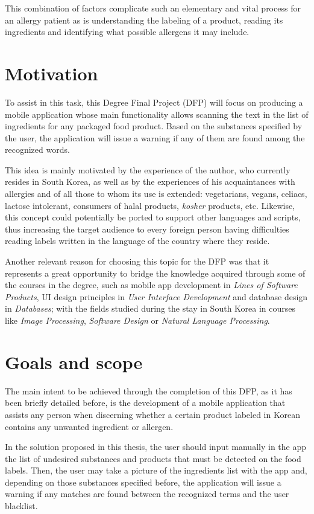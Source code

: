 This combination of factors complicate such an elementary and vital process for an allergy patient as is understanding the labeling of a product, reading its ingredients and identifying what possible allergens it may include.

\section{Motivation}
    
To assist in this task, this Degree Final Project (DFP) will focus on producing a mobile application whose main functionality allows scanning the text in the list of ingredients for any packaged food product. Based on the substances specified by the user, the application will issue a warning if any of them are found among the recognized words.
    
This idea is mainly motivated by the experience of the author, who currently resides in South Korea, as well as by the experiences of his acquaintances with allergies and of all those to whom its use is extended: vegetarians, vegans, celiacs, lactose intolerant, consumers of halal products, \textit{kosher} products, etc. Likewise, this concept could potentially be ported to support other languages and scripts, thus increasing the target audience to every foreign person having difficulties reading labels written in the language of the country where they reside.

Another relevant reason for choosing this topic for the DFP was that it represents a great opportunity to bridge the knowledge acquired through some of the courses in the degree, such as mobile app development in \textit{Lines of Software Products}, UI design principles in \textit{User Interface Development} and database design in \textit{Databases}; with the fields studied during the stay in South Korea in courses like \textit{Image Processing}, \textit{Software Design} or \textit{Natural Language Processing}.

\section{Goals and scope}

The main intent to be achieved through the completion of this DFP, as it has been briefly detailed before, is the development of a mobile application that assists any person when discerning whether a certain product labeled in Korean contains any unwanted ingredient or allergen.

In the solution proposed in this thesis, the user should input manually in the app the list of undesired substances and products that must be detected on the food labels. Then, the user may take a picture of the ingredients list with the app and, depending on those substances specified before, the application will issue a warning if any matches are found between the recognized terms and the user blacklist.

